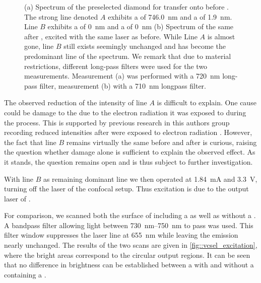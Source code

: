 \begin{figure}[htp]
\begin{subfigure}[t]{ 0.49\linewidth}
			\caption{}
			\label{subfig::spectrum_vcsel_confocal_excitation_with_diamond}
		\end{subfigure}
		\caption[\Siv properties before and after \pp]{(a) Spectrum of the preselected diamond for transfer onto \BmFour before \pp. The strong line denoted $A$ exhibits a \cwl of \SI{746.0}{nm} and a \lw of \SI{1.9}{nm}. Line $B$ exhibits a \cwl of \SI{0}{nm} and a \lw of \SI{0}{nm}  (b) Spectrum of the same \siv after \pp, excited with the same laser as before. While Line $A$ is almost gone, line $B$ still exists seemingly unchanged and has become the predominant line of the spectrum. We remark that due to material restrictions, different long-pass filters were used for the two measurements. Measurement (a) was performed with a \SI{720}{nm} long-pass filter, measurement (b) with a \SI{710}{nm} longpass filter.}
		\label{fig::spectrum_vcsel_diamond}
	\end{figure}

	The observed reduction of the intensity of line $A$ is difficult to explain. One cause could be damage to the \cc due to the electron radiation it was exposed to during the \pp process. This is supported by previous research in this authors group recording reduced \fl intensities after \ccs were exposed to electron radiation \cite{alexmeyer::baccthesis} . However, the fact that line $B$ remains virtually the same before and after \pp is curious, raising the question whether damage alone is sufficient to explain the observed effect. As it stands, the question remains open and is thus subject to further investigation.

	With line $B$ as remaining dominant line we then operated \BmFour at \SI{1.84}{mA} and \SI{3.3}{V}, turning off the laser of the confocal setup.
	Thus \siv excitation is due to the output laser of \BmFour.

	For comparison, we scanned both the surface of \BmFour including a \nd as well as \BmTwo without a \nd. A bandpass filter allowing light between \SIrange{730}{750}{\nm} to pass was used.
	This filter window suppresses the \VCSEL laser line at \SI{655}{\nm} while leaving the \siv emission nearly unchanged. The results of the two scans are given in \autoref{fig::vcsel_excitation}, where the bright areas correspond to the circular \VCSEL output regions. It can be seen that no difference in brightness can be established between a \VCSEL with and without a \nd containing a \siv.


